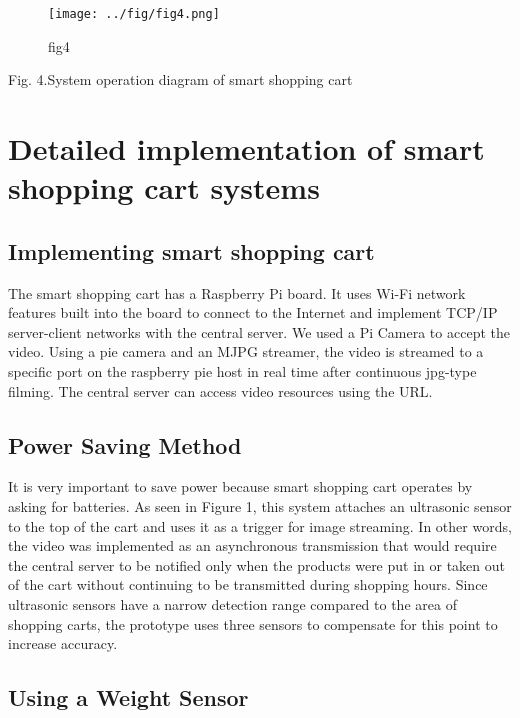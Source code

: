 \documentclass[smallextended]{svjour3}       %
\begin{document}
\begin{figure}
\centering
\texttt{[image: ../fig/fig4.png]}
\caption{fig4}
\end{figure}

Fig. 4.System operation diagram of smart shopping cart

\hypertarget{detailed-implementation-of-smart-shopping-cart-systems}{%
\section{Detailed implementation of smart shopping cart
systems}\label{detailed-implementation-of-smart-shopping-cart-systems}}

\hypertarget{implementing-smart-shopping-cart}{%
\subsection{Implementing smart shopping
cart}\label{implementing-smart-shopping-cart}}

The smart shopping cart has a Raspberry Pi board. It uses Wi-Fi network
features built into the board to connect to the Internet and implement
TCP/IP server-client networks with the central server. We used a Pi
Camera to accept the video. Using a pie camera and an MJPG streamer, the
video is streamed to a specific port on the raspberry pie host in real
time after continuous jpg-type filming. The central server can access
video resources using the URL.

\hypertarget{power-saving-method}{%
\subsection{Power Saving Method}\label{power-saving-method}}

It is very important to save power because smart shopping cart operates
by asking for batteries. As seen in Figure 1, this system attaches an
ultrasonic sensor to the top of the cart and uses it as a trigger for
image streaming. In other words, the video was implemented as an
asynchronous transmission that would require the central server to be
notified only when the products were put in or taken out of the cart
without continuing to be transmitted during shopping hours. Since
ultrasonic sensors have a narrow detection range compared to the area of
shopping carts, the prototype uses three sensors to compensate for this
point to increase accuracy.

\hypertarget{using-a-weight-sensor}{%
\subsection{Using a Weight Sensor}\label{using-a-weight-sensor}}
\end{document}
